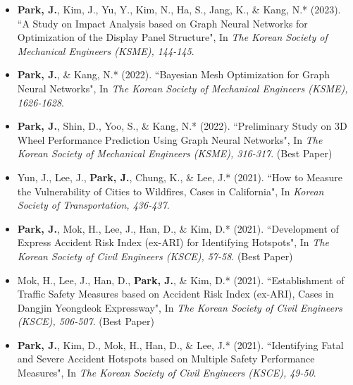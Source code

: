 \documentclass[a4paper,10pt]{article}
\begin{document}
\begin{itemize}[left=0pt]
    \item \textbf{Park, J.}, Kim, J., Yu, Y., Kim, N., Ha, S., Jang, K., \& Kang, N.* (2023). “A Study on Impact Analysis based on Graph Neural Networks for Optimization of the Display Panel Structure", In \textit{The Korean Society of Mechanical Engineers (KSME), 144-145}.
    
    \item \textbf{Park, J.}, \& Kang, N.* (2022). “Bayesian Mesh Optimization for Graph Neural Networks", In \textit{The Korean Society of Mechanical Engineers (KSME), 1626-1628}.
    
    \item \textbf{Park, J.}, Shin, D., Yoo, S., \& Kang, N.* (2022). “Preliminary Study on 3D Wheel Performance Prediction Using Graph Neural Networks", In \textit{The Korean Society of Mechanical Engineers (KSME), 316-317}. (Best Paper)
    
    \item Yun, J., Lee, J., \textbf{Park, J.}, Chung, K., \& Lee, J.* (2021). “How to Measure the Vulnerability of Cities to Wildfires, Cases in California", In \textit{Korean Society of Transportation, 436-437}.
    
    \item \textbf{Park, J.}, Mok, H., Lee, J., Han, D., \& Kim, D.* (2021). “Development of Express Accident Risk Index (ex-ARI) for Identifying Hotspots", In \textit{The Korean Society of Civil Engineers (KSCE), 57-58}. (Best Paper)
    
    \item Mok, H., Lee, J., Han, D., \textbf{Park, J.}, \& Kim, D.* (2021). “Establishment of Traffic Safety Measures based on Accident Risk Index (ex-ARI), Cases in Dangjin Yeongdeok Expressway", In \textit{The Korean Society of Civil Engineers (KSCE), 506-507}. (Best Paper)
    
    \item \textbf{Park, J.}, Kim, D., Mok, H., Han, D., \& Lee, J.* (2021). “Identifying Fatal and Severe Accident Hotspots based on Multiple Safety Performance Measures", In \textit{The Korean Society of Civil Engineers (KSCE), 49-50}.
\end{itemize}
\end{document}
